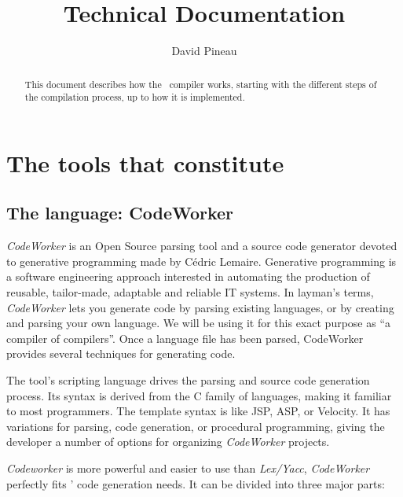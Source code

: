 \documentclass[american]{rtxreport}
\author{David Pineau}
\title{Technical Documentation}
\begin{document}
\maketitle

\rtxmaketitleblock

\tableofcontents

\begin{abstract}
    This document describes how the \rtx\ compiler works, starting with the
    different steps of the compilation process, up to how it is implemented.
\end{abstract}





\chapter{The tools that constitute \rtx}

\section{The language: CodeWorker}

\emph{CodeWorker} is an Open Source parsing tool and a source code generator
devoted to generative programming made by Cédric Lemaire. Generative
programming is a software engineering approach interested in automating the
production of reusable, tailor-made, adaptable and reliable IT systems. In
layman's terms, \emph{CodeWorker} lets you generate code by parsing existing
languages, or by creating and parsing your own language. We will be using it
for this exact purpose as ``a compiler of compilers''. Once a language file has
been parsed, CodeWorker provides several techniques for generating code.

The tool's scripting language drives the parsing and source code generation
process. Its syntax is derived from the C family of languages, making it
familiar to most programmers. The template syntax is like JSP, ASP, or
Velocity. It has variations for parsing, code generation, or procedural
programming, giving the developer a number of options for organizing
\emph{CodeWorker} projects. 

\emph{Codeworker} is more powerful and easier to use than \emph{Lex/Yacc},
\emph{CodeWorker} perfectly fits \rtx' code generation needs. It can be
divided into three major parts:
\end{document}
